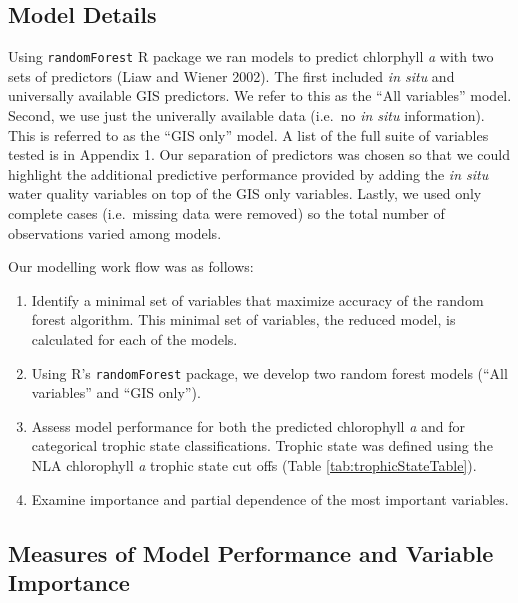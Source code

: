 \documentclass[11pt,]{article}
\begin{document}
\subsection{Model Details}\label{model-details}

Using \texttt{randomForest} R package we ran models to predict
chlorphyll \emph{a} with two sets of predictors (Liaw and Wiener 2002).
The first included \emph{in situ} and universally available GIS
predictors. We refer to this as the ``All variables'' model. Second, we
use just the univerally available data (i.e.~no \emph{in situ}
information). This is referred to as the ``GIS only'' model. A list of
the full suite of variables tested is in Appendix 1. Our separation of
predictors was chosen so that we could highlight the additional
predictive performance provided by adding the \emph{in situ} water
quality variables on top of the GIS only variables. Lastly, we used only
complete cases (i.e.~missing data were removed) so the total number of
observations varied among models.

Our modelling work flow was as follows:

\begin{enumerate}
\def\labelenumi{\arabic{enumi}.}
\itemsep1pt\parskip0pt
\item
  Identify a minimal set of variables that maximize accuracy of the
  random forest algorithm. This minimal set of variables, the reduced
  model, is calculated for each of the models.
\item
  Using R's \texttt{randomForest} package, we develop two random forest
  models (``All variables'' and ``GIS only'').
\item
  Assess model performance for both the predicted chlorophyll \emph{a}
  and for categorical trophic state classifications. Trophic state was
  defined using the NLA chlorophyll \emph{a} trophic state cut offs
  (Table \ref{tab:trophicStateTable}).
\item
  Examine importance and partial dependence of the most important
  variables.
\end{enumerate}

\subsection{Measures of Model Performance and Variable
Importance}\label{measures-of-model-performance-and-variable-importance}
\end{document}
